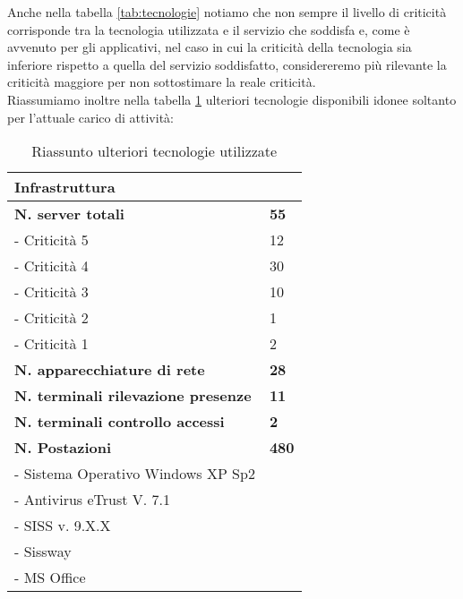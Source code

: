 \newpage
Anche nella tabella \ref{tab:tecnologie} notiamo che non sempre il livello di criticità corrisponde tra la tecnologia utilizzata e il servizio che soddisfa e, come è avvenuto per gli applicativi,  nel caso in cui la criticità della tecnologia sia inferiore rispetto a quella del servizio soddisfatto, considereremo più rilevante la criticità maggiore per non sottostimare la reale criticità. \\


Riassumiamo inoltre nella tabella \ref{tab:infrastruttureGenerali} ulteriori tecnologie disponibili idonee soltanto per l’attuale carico di attività:
\begin{table}[h] 
	\centering
	\begin{tabular}{|l|l|}
		\hline
		\rowcolor[HTML]{EFEFEF} 
		\textbf{Infrastruttura} & \\ \hline
		\textbf{N. server totali}					& \textbf{55} \\
		- Criticità 5 				& 12 \\
		- Criticità 4				& 30 \\
		- Criticità 3				& 10 	\\
		- Criticità 2				& 1 	\\ 
		- Criticità 1				& 2 	\\  \hline
		\textbf{N. apparecchiature di rete}  				& \textbf{28}			\\\hline
		\textbf{N. terminali rilevazione presenze}	  			& \textbf{11}		\\\hline
		\textbf{N. terminali controllo accessi}	  			& \textbf{2}		\\\hline
		\textbf{N. Postazioni}					& \textbf{480} \\
		- Sistema Operativo Windows XP Sp2 & \\
		- Antivirus eTrust V. 7.1 & \\
		- SISS v. 9.X.X & \\
		- Sissway & \\
		- MS Office & \\  \hline
	\end{tabular}
	\caption{Riassunto ulteriori tecnologie utilizzate}\label{tab:infrastruttureGenerali}
\end{table}
	